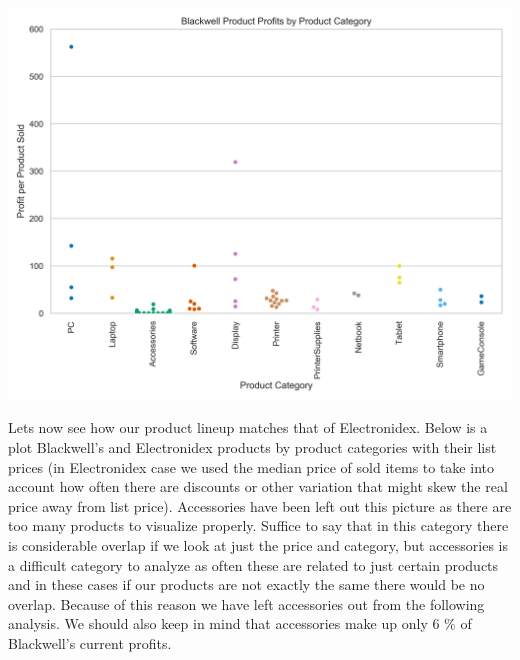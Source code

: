 \documentclass[12pt,a4paper,leqno]{report}
\theoremstyle{plain}
\theoremstyle{definition}
\theoremstyle{remark}
\begin{document}
\bigskip
{
    \centering
    \includegraphics[width=\textwidth,height=\textheight,keepaspectratio]{blackwell_product_profitability_distribution_by_category.png}
    \par
}
\bigskip

Lets now see how our product lineup matches that of Electronidex. Below is a plot Blackwell's and Electronidex
products by product categories with their list prices (in Electronidex case we used the median price of sold items
to take into account how often there are discounts or other variation that might skew the real price away from list price).
Accessories have been left out this picture as there are too many products to visualize properly. Suffice to say
that in this category there is considerable overlap if we look at just the price and category, but
accessories is a difficult category to analyze as often these are related to just certain products and in these cases
if our products are not exactly the same there would be no overlap. Because of this reason we have left
accessories out from the following analysis. We should also keep in mind that accessories make up only 6 \%
of Blackwell's current profits.
\end{document}
